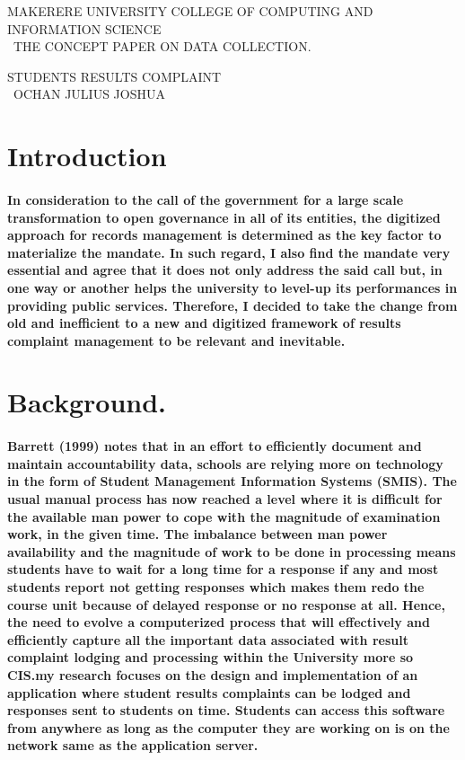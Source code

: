 \documentclass[10pt]{article}
\begin{document}
\author{}
 MAKERERE UNIVERSITY COLLEGE OF COMPUTING AND INFORMATION SCIENCE
 \\\
 THE CONCEPT PAPER ON DATA COLLECTION.
 \title{} 
 STUDENTS RESULTS COMPLAINT
\\\ 
 OCHAN JULIUS JOSHUA
 \section{Introduction}
 \paragraph{In consideration to the call of the government for a large scale transformation to open governance in all of its entities, the digitized approach for records management is determined as the key factor to materialize the mandate. In such regard, I also find the mandate very essential and agree that it does not only address the said call but, in one way or another helps the university to level-up its performances in providing public services. Therefore, I decided to take the change from old and inefficient to a new and digitized framework of results complaint management to be relevant and inevitable.}
 
\section{Background.}
\paragraph{Barrett (1999) notes that in an effort to efficiently document and maintain accountability data, schools are relying more on technology in the form of Student Management Information Systems (SMIS). The usual manual process has now reached a level where it is difficult for the available man power to cope with the magnitude of examination work, in the given time. The imbalance between man power availability and the magnitude of work to be done in processing means students have to wait for a long time for a response if any and most students report not getting responses which makes them redo the course unit because of delayed response or no response at all. Hence, the need to evolve a computerized process that will effectively and efficiently capture all the important data associated with result complaint lodging and processing within the University more so CIS.my research focuses on the design and implementation of an application where student results complaints can be lodged and responses sent to students on time. Students can access this software from anywhere as long as the computer they are working on is on the network same as the application server.}
 
\end{document}
